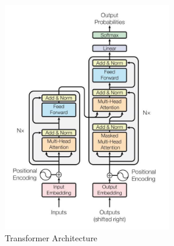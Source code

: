 \begin{figure}[H]
        \centering
        \includegraphics[height=100mm]{figures/transformer_architecture.jpg}
        \caption{Transformer Architecture\cite{noauthor_language_nodate}}
        \label{meth:transformer_architecture}
\end{figure}

